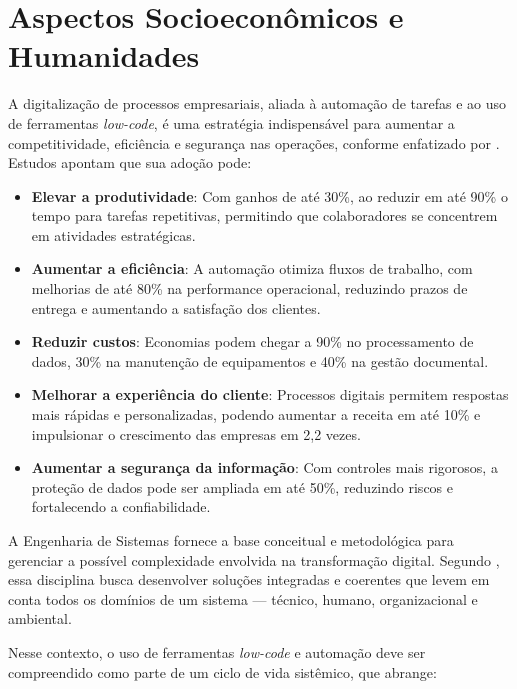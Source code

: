 
\chapter{Aspectos Socioeconômicos e Humanidades}\label{chap:humanidades} %

A digitalização de processos empresariais, aliada à automação de tarefas e ao uso de ferramentas \textit{low-code}, é uma estratégia indispensável para aumentar a competitividade, eficiência e segurança nas operações, conforme enfatizado por \cite{sebraeDigitalizacaoProcessos}. Estudos apontam que sua adoção pode:

\begin{itemize}
	\item \textbf{Elevar a produtividade}: Com ganhos de até 30\%, ao reduzir em até 90\% o tempo para tarefas repetitivas, permitindo que colaboradores se concentrem em atividades estratégicas.
	\item \textbf{Aumentar a eficiência}: A automação otimiza fluxos de trabalho, com melhorias de até 80\% na performance operacional, reduzindo prazos de entrega e aumentando a satisfação dos clientes.
	\item \textbf{Reduzir custos}: Economias podem chegar a 90\% no processamento de dados, 30\% na manutenção de equipamentos e 40\% na gestão documental.
	\item \textbf{Melhorar a experiência do cliente}: Processos digitais permitem respostas mais rápidas e personalizadas, podendo aumentar a receita em até 10\% e impulsionar o crescimento das empresas em 2,2 vezes.
	\item \textbf{Aumentar a segurança da informação}: Com controles mais rigorosos, a proteção de dados pode ser ampliada em até 50\%, reduzindo riscos e fortalecendo a confiabilidade.
\end{itemize}

A Engenharia de Sistemas fornece a base conceitual e metodológica para gerenciar a possível complexidade envolvida na transformação digital. Segundo \cite{incoseHandbook}, essa disciplina busca desenvolver soluções integradas e coerentes que levem em conta todos os domínios de um sistema — técnico, humano, organizacional e ambiental.

Nesse contexto, o uso de ferramentas \textit{low-code} e automação deve ser compreendido como parte de um ciclo de vida sistêmico, que abrange:

